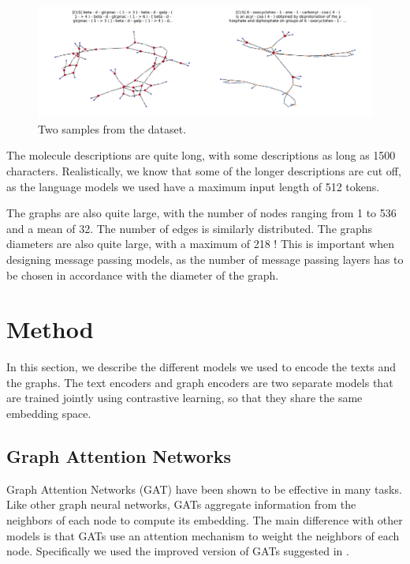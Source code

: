 \documentclass[switch, 11pt]{article}
\begin{document}
\begin{multicols}{2}
    \begin{figure}[H]
        \centering
        \includegraphics[width=\columnwidth]{figures/graphs.png}
        \caption{Two samples from the dataset.}
        \label{fig:dataset}
    \end{figure}

    The molecule descriptions are quite long, with some descriptions as long as 1500 characters. Realistically, we know that some of the longer descriptions are cut off, as the language models we used have a maximum input length of 512 tokens.

    The graphs are also quite large, with the number of nodes ranging from 1 to 536 and a mean of 32. The number of edges is similarly distributed. The graphs diameters are also quite large, with a maximum of 218 ! This is important when designing message passing models, as the number of message passing layers has to be chosen in accordance with the diameter of the graph.

    \section{Method}

    In this section, we describe the different models we used to encode the texts and the graphs. The text encoders and graph encoders are two separate models that are trained jointly using contrastive learning, so that they share the same embedding space.

    \subsection{Graph Attention Networks}

    Graph Attention Networks (GAT) \cite{velickovic-2018} have been shown to be effective in many tasks. Like other graph neural networks, GATs aggregate information from the neighbors of each node to compute its embedding. The main difference with other models is that GATs use an attention mechanism to weight the neighbors of each node. Specifically we used the improved version of GATs suggested in \cite{brody-2021}.


\end{multicols}
\end{document}
